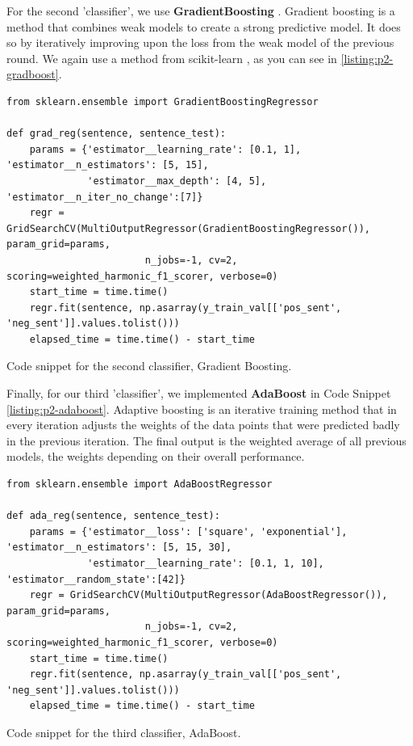 For the second 'classifier', we use \textbf{GradientBoosting} \cite{gradboost1, gradboost2, gradboost3}. Gradient boosting is a method that combines weak models to create a strong predictive model. It does so by iteratively improving upon the loss from the weak model of the previous round.
We again use a method from scikit-learn \cite{sklearn1, sklearn2}, as you can see in \ref{listing:p2-gradboost}.

\begin{listing*}
\begin{verbatim}
from sklearn.ensemble import GradientBoostingRegressor

def grad_reg(sentence, sentence_test):
    params = {'estimator__learning_rate': [0.1, 1], 'estimator__n_estimators': [5, 15],
              'estimator__max_depth': [4, 5], 'estimator__n_iter_no_change':[7]}
    regr = GridSearchCV(MultiOutputRegressor(GradientBoostingRegressor()), param_grid=params,
                        n_jobs=-1, cv=2, scoring=weighted_harmonic_f1_scorer, verbose=0)
    start_time = time.time()
    regr.fit(sentence, np.asarray(y_train_val[['pos_sent', 'neg_sent']].values.tolist()))
    elapsed_time = time.time() - start_time
\end{verbatim}
\caption{Code snippet for the second classifier, Gradient Boosting.}
\label{listing:p2-gradboost}
\end{listing*}

Finally, for our third 'classifier', we implemented \textbf{AdaBoost} \cite{adaboost} in Code Snippet \ref{listing:p2-adaboost}. Adaptive boosting is an iterative training method that in every iteration adjusts the weights of  the data points that were predicted badly in the previous iteration. The final output is the weighted average of all previous models, the weights depending on their overall performance.

\begin{listing*}
\begin{verbatim}
from sklearn.ensemble import AdaBoostRegressor

def ada_reg(sentence, sentence_test):
    params = {'estimator__loss': ['square', 'exponential'], 'estimator__n_estimators': [5, 15, 30],
              'estimator__learning_rate': [0.1, 1, 10], 'estimator__random_state':[42]}
    regr = GridSearchCV(MultiOutputRegressor(AdaBoostRegressor()), param_grid=params,
                        n_jobs=-1, cv=2, scoring=weighted_harmonic_f1_scorer, verbose=0)
    start_time = time.time()
    regr.fit(sentence, np.asarray(y_train_val[['pos_sent', 'neg_sent']].values.tolist()))
    elapsed_time = time.time() - start_time
\end{verbatim}
\caption{Code snippet for the third classifier, AdaBoost.}
\label{listing:p2-adaboost}
\end{listing*}

